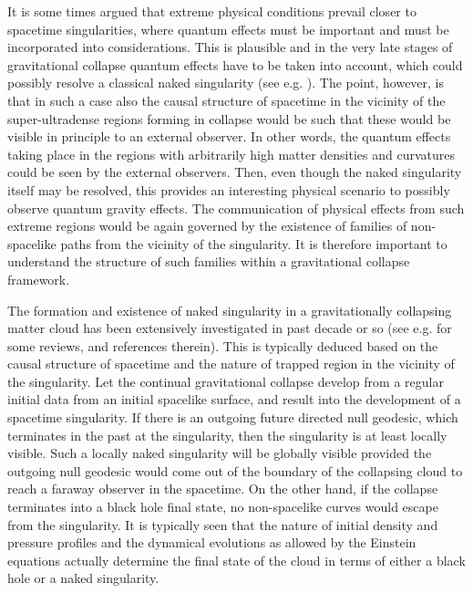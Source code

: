 \documentclass[twocolumn,aps,amsmath,amssymb,prl,showpacs,preprintnumbers]
{revtex4}
\begin{document}
It is some times argued that extreme physical conditions
prevail closer to spacetime singularities, where quantum effects must
be important and must be incorporated into considerations.
This is plausible and in the very late stages of gravitational collapse 
quantum effects have to be taken into account, which could possibly 
resolve a classical naked singularity (see e.g.
\cite{GJS}).
The point, however, is that in such a case also the causal
structure of spacetime in the vicinity of the super-ultradense 
regions forming in collapse would be such that these would be
visible in principle to an external observer. In other words,
the quantum effects taking place in the regions with arbitrarily
high matter densities and curvatures could be seen by the 
external observers. Then, even though the naked singularity 
itself may be resolved, this provides an interesting physical 
scenario to possibly observe quantum gravity effects. The communication 
of physical effects from such extreme regions would be again 
governed by the existence of families of non-spacelike paths from 
the vicinity of the singularity. It is therefore important to 
understand the structure of such families within a gravitational 
collapse framework.







The formation and existence of naked singularity in a 
gravitationally collapsing matter cloud has been extensively
investigated in past decade or so (see e.g. 
\cite{rev} 
for some reviews, and references therein). This is typically deduced 
based on the causal structure of spacetime and the nature of trapped 
region in the vicinity of the singularity. Let the continual gravitational 
collapse develop from a regular initial data from an initial 
spacelike surface, and result into the development of a spacetime 
singularity. If there is an outgoing future directed null geodesic, 
which terminates in the past at the singularity, then the singularity
is at least locally visible. Such a locally naked singularity will   
be globally visible provided the outgoing null geodesic would come out 
of the boundary of the collapsing cloud to reach a faraway observer 
in the spacetime. On the other hand, if the collapse terminates into 
a black hole final state, no non-spacelike curves would escape 
from the singularity. It is typically seen that the nature of 
initial density and pressure profiles and the dynamical evolutions 
as allowed by the Einstein equations actually determine the final 
state of the cloud in terms of either a black hole or a naked 
singularity.
\end{document}

